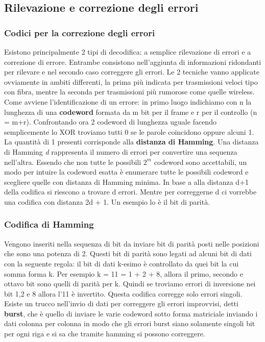 \subsection{Rilevazione e correzione degli errori}
\subsubsection{Codici per la correzione degli errori}
Esistono principalmente 2 tipi di decodifica: a semplice rilevazione di errori e a correzione di errore. Entrambe consistono nell'aggiunta di informazioni ridondanti per rilevare e nel secondo caso correggere gli errori. Le 2 tecniche vanno applicate ovviamente in ambiti differenti, la prima più indicata per trasmissioni veloci tipo con fibra, mentre la seconda per trasmissioni più rumorose come quelle wireless. \\
Come avviene l'identificazione di un errore: in primo luogo indichiamo con n la lunghezza di una \textbf{codeword} formata da m bit per il frame e r per il controllo (n = m+r). Confrontando ora 2 codeword di lunghezza uguale facendo semplicemente lo XOR troviamo tutti 0 se le parole coincidono oppure alcuni 1. La quantità di 1 presenti corrisponde alla \textbf{distanza di Hamming}. Una distanza di Hamming \textit{d} rappresenta il numero di errori per convertire una sequenza nell'altra. Essendo che non tutte le possibili \(2^m\) codeword sono accettabili, un modo per intuire la codeword esatta è enumerare tutte le possibili codeword e scegliere quelle con distanza di Hamming minima. In base a alla distanza d+1 della codifica si riescono a trovare d errori. Mentre per correggerne d ci vorrebbe una codifica con distanza 2d + 1. Un esempio lo è il bit di parità.

\subsubsection*{Codifica di Hamming}
Vengono inseriti nella sequenza di bit da inviare bit di parità posti nelle posizioni che sono una potenza di 2. Questi bit di parità sono legati ad alcuni bit di dati con la seguente regola: il bit di dati k-esimo è controllato da quei bit la cui somma forma k. Per esempio k = 11 = 1 + 2 + 8, allora il primo, secondo e ottavo bit sono quelli di parità per k. Quindi se troviamo errori di inversione nei bit 1,2 e 8 allora l'11 è invertito. Questa codifica corregge solo errori singoli. Esiste un trucco nell'invio di dati per correggere gli errori improvvisi, detti \textbf{burst}, che è quello di inviare le varie codeword sotto forma matriciale inviando i dati colonna per colonna in modo che gli errori burst siano solamente singoli bit per ogni riga e si sa che tramite hamming si possono correggere.

